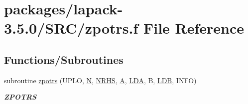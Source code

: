 \hypertarget{zpotrs_8f}{}\section{packages/lapack-\/3.5.0/\+S\+R\+C/zpotrs.f File Reference}
\label{zpotrs_8f}
\subsection*{Functions/\+Subroutines}
\begin{DoxyCompactItemize}
\item 
subroutine \hyperlink{group__complex16POcomputational_gaa2116ea574b01efda584dff0b74c9fcd}{zpotrs} (U\+P\+L\+O, \hyperlink{polmisc_8c_a0240ac851181b84ac374872dc5434ee4}{N}, \hyperlink{example__user_8c_aa0138da002ce2a90360df2f521eb3198}{N\+R\+H\+S}, \hyperlink{classA}{A}, \hyperlink{example__user_8c_ae946da542ce0db94dced19b2ecefd1aa}{L\+D\+A}, B, \hyperlink{example__user_8c_a50e90a7104df172b5a89a06c47fcca04}{L\+D\+B}, I\+N\+F\+O)
\begin{DoxyCompactList}\small\item\em {\bfseries Z\+P\+O\+T\+R\+S} \end{DoxyCompactList}\end{DoxyCompactItemize}
